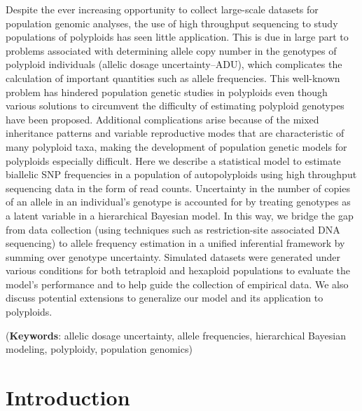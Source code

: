 \documentclass[11pt,english,letterpaper,oneside]{article}
\begin{document}
Despite the ever increasing opportunity to collect large-scale datasets for population genomic analyses, the use of high throughput sequencing to study populations of polyploids has seen little application. This is due in large part to problems associated with determining allele copy number in the genotypes of polyploid individuals (allelic dosage uncertainty--ADU), which complicates the calculation of important quantities such as allele frequencies. This well-known problem has hindered population genetic studies in polyploids even though various solutions to circumvent the difficulty of estimating polyploid genotypes have been proposed. Additional complications arise because of the mixed inheritance patterns and variable reproductive modes that are characteristic of many polyploid taxa, making the development of population genetic models for polyploids especially difficult. Here we describe a statistical model to estimate biallelic SNP frequencies in a population of autopolyploids using high throughput sequencing data in the form of read counts. Uncertainty in the number of copies of an allele in an individual's genotype is accounted for by treating genotypes as a latent variable in a hierarchical Bayesian model. In this way, we bridge the gap from data collection (using techniques such as restriction-site associated DNA sequencing) to allele frequency estimation in a unified inferential framework by summing over genotype uncertainty. Simulated datasets were generated under various conditions for both tetraploid and hexaploid populations to evaluate the model's performance and to help guide the collection of empirical data. We also discuss potential extensions to generalize our model and its application to polyploids.
\vspace{0.25in}

\noindent (\textbf{Keywords}: allelic dosage uncertainty, allele frequencies, hierarchical Bayesian modeling, polyploidy, population genomics)
\vspace{0.25in}

\section*{Introduction}            %
\end{document}
